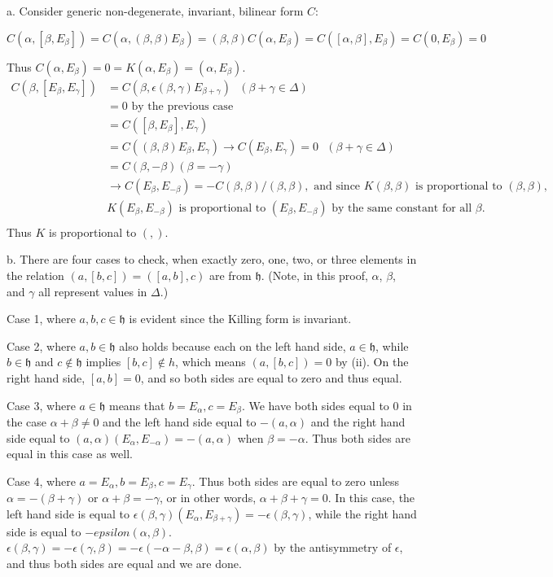 \documentclass[11pt]{article}
\newcommand{\h}{\ensuremath{\mathfrak{h}}}
\begin{document}
a.  Consider generic non-degenerate, invariant, bilinear form $C$:

$C(\alpha,[\beta,E_\beta]) = C(\alpha,(\beta,\beta)E_\beta) = (\beta,\beta) C(\alpha,E_\beta) = C([\alpha,\beta],E_\beta) = C(0,E_\beta) = 0$

Thus $C(\alpha,E_\beta) = 0 = K(\alpha,E_\beta) = (\alpha,E_\beta)$.
\begin{align*}
C(\beta,[E_\beta,E_\gamma]) &= C(\beta,\epsilon(\beta,\gamma)E_{\beta+\gamma}) \mbox{     $(\beta + \gamma \in \Delta)$} \\
&= 0 \mbox{ by the previous case} \\
&= C([\beta,E_\beta],E_\gamma) \\
&= C((\beta,\beta)E_\beta,E_\gamma) \rightarrow C(E_\beta,E_\gamma) = 0 \mbox{     $(\beta + \gamma \in \Delta)$} \\
&= C(\beta,- \beta) \mbox{$(\beta = -\gamma)$} \\
&\rightarrow C(E_\beta,E_{-\beta}) = -C(\beta,\beta)/(\beta,\beta), \mbox{ and since } K(\beta,\beta) \mbox{ is proportional to } (\beta,\beta),\\
& K(E_\beta,E_{-\beta}) \mbox{ is proportional to } (E_\beta,E_{-\beta}) \mbox{ by the same constant for all $\beta$.} \\
\end{align*}
Thus $K$ is proportional to $(,)$.

b.  There are four cases to check, when exactly zero, one, two, or three elements in the relation $(a,[b,c]) = ([a,b],c)$ are from $\h$. (Note, in this proof, $\alpha$, $\beta$, and $\gamma$ all represent values in $\Delta$.)

Case 1, where $a,b,c \in \h$ is evident since the Killing form is invariant.

Case 2, where $a,b \in \h$ also holds because each on the left hand side, $a \in \h$, while $b \in \h$ and $c \notin \h$ implies $[b,c] \notin h$, which means $(a,[b,c]) = 0$ by (ii). On the right hand side, $[a,b] = 0$, and so both sides are equal to zero and thus equal.

Case 3, where $a \in \h$ means that $b = E_\alpha, c = E_\beta$.  We have both sides equal to 0 in the case $\alpha + \beta \ne 0$ and the left hand side equal to $-(a,\alpha) $ and the right hand side equal to $(a,\alpha) (E_\alpha,E_{-\alpha}) = -(a,\alpha)$ when $\beta = -\alpha$. Thus both sides are equal in this case as well.

Case 4, where $a = E_\alpha, b = E_\beta, c = E_\gamma$.  Thus both sides are equal to zero unless $\alpha = - (\beta + \gamma)$ or $\alpha + \beta = -\gamma$, or in other words, $\alpha + \beta + \gamma = 0$.  In this case, the left hand side is equal to $\epsilon(\beta,\gamma) (E_\alpha,E_{\beta+\gamma}) = -\epsilon(\beta,\gamma)$, while the right hand side is equal to $-epsilon(\alpha,\beta)$.  $\epsilon(\beta,\gamma) = -\epsilon(\gamma,\beta) = -\epsilon(-\alpha-\beta,\beta) = \epsilon(\alpha,\beta)$ by the antisymmetry of $\epsilon$, and thus both sides are equal and we are done.
\end{document}
